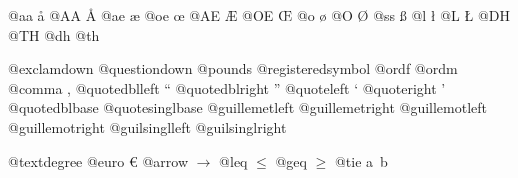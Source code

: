 \documentclass{book}
\begin{document}
@aa \aa{}
@AA \AA{}
@ae \ae{}
@oe \oe{}
@AE \AE{}
@OE \OE{}
@o \o{}
@O \O{}
@ss \ss{}
@l \l{}
@L \L{}
@DH \DH{}
@TH \TH{}
@dh \dh{}
@th \th{}

@exclamdown \textexclamdown{}
@questiondown \textquestiondown{}
@pounds \textsterling{}
@registeredsymbol \circledR{}
@ordf \textordfeminine{}
@ordm \textordmasculine{}
@comma ,
@quotedblleft \textquotedblleft{}
@quotedblright \textquotedblright{}
@quoteleft \textquoteleft{}
@quoteright \textquoteright{}
@quotedblbase \quotedblbase{}
@quotesinglbase \quotesinglbase{}
@guillemetleft \guillemotleft{}
@guillemetright \guillemotright{}
@guillemotleft \guillemotleft{}
@guillemotright \guillemotright{}
@guilsinglleft \guilsinglleft{}
@guilsinglright \guilsinglright{}

@textdegree \textdegree{}
@euro \euro{}
@arrow $\rightarrow{}$
@leq $\leq{}$
@geq $\geq{}$
@tie a~b
\end{document}
